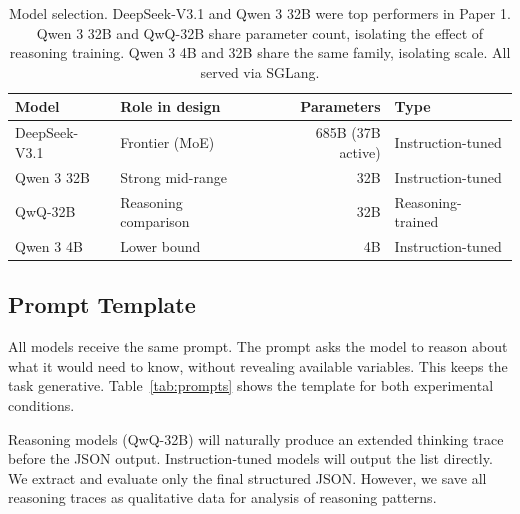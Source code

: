\documentclass[11pt]{article}
\begin{document}
\begin{table}[h]
\centering
\caption{Model selection. DeepSeek-V3.1 and Qwen 3 32B were top performers in Paper 1. Qwen 3 32B and QwQ-32B share parameter count, isolating the effect of reasoning training. Qwen 3 4B and 32B share the same family, isolating scale. All served via SGLang.}
\label{tab:models}
\begin{tabular}{llrl}
\toprule
\textbf{Model} & \textbf{Role in design} & \textbf{Parameters} & \textbf{Type} \\
\midrule
DeepSeek-V3.1 & Frontier (MoE) & 685B (37B active) & Instruction-tuned \\
Qwen 3 32B & Strong mid-range & 32B & Instruction-tuned \\
QwQ-32B & Reasoning comparison & 32B & Reasoning-trained \\
Qwen 3 4B & Lower bound & 4B & Instruction-tuned \\
\bottomrule
\end{tabular}
\end{table}

\subsection{Prompt Template}

All models receive the same prompt. The prompt asks the model to reason about what it would need to know, without revealing available variables. This keeps the task generative. Table~\ref{tab:prompts} shows the template for both experimental conditions.

Reasoning models (QwQ-32B) will naturally produce an extended thinking trace before the JSON output. Instruction-tuned models will output the list directly. We extract and evaluate only the final structured JSON. However, we save all reasoning traces as qualitative data for analysis of reasoning patterns.
\end{document}
